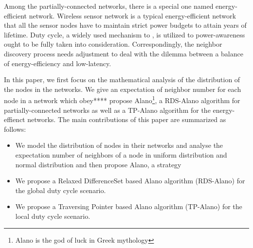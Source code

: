  
 

Among the partially-connected networks, there is a special 
one named energy-efficient network.
Wireless sensor network is a typical energy-efficient network that all the sensor nodes have to maintain 
strict power budgets to attain years of lifetime\cite{dunkels2011contikimac}.
Duty cycle, a widely used mechanism to   , is utilized to power-awareness ought to be fully taken into consideration.
Correspondingly, the neighbor discovery process needs adjustment to deal with the dilemma between 
a balance of energy-efficiency and low-latency.






In this paper, we first focus on the mathematical analysis of the distribution of the nodes in the networks.
We give an expectation of neighbor number for each node in a network which obey****
propose Alano\footnote{Alano is the god of luck in Greek mythology }, 
a RDS-Alano algorithm for partially-connected networks 
as well as a TP-Alano algorithm for the energy-effienct networks.
The main contributions of this paper are summarized as follows:
\begin{itemize}
\item[1)] We model the distribution of nodes in their networks and analyse the 
expectation number of neighbors of a node in uniform distribution and normal
distribution and then propose Alano, a strategy
\item[2)] We propose a Relaxed DifferenceSet based Alano algorithm (RDS-Alano) 
for the global duty cycle scenario. 
\item[3)] We propose a Traversing Pointer based Alano algorithm (TP-Alano) 
for the local duty cycle scenario. 
\end{itemize}




